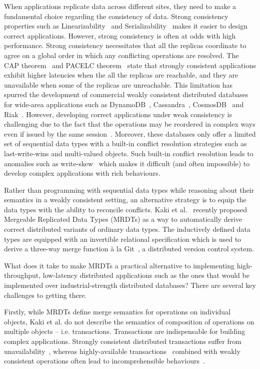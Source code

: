 When applications replicate data across different sites, they need to make a
fundamental choice regarding the consistency of data. Strong consistency properties such
as Linearizability~\cite{Herlihy90} and Serializability~\cite{Bernstein79}
makes it easier to design correct applications. However, strong consistency is often at
odds with high performance. Strong consistency necessitates that all the replicas
coordinate to agree on a global order in which any conflicting operations are
resolved. The CAP theorem~\cite{Gilbert02} and PACELC theorem~\cite{Abadi12}
state that strongly consistent applications exhibit higher latencies when the all
the replicas are reachable, and they are unavailable when some of the replicas are
unreachable. This limitation has spurred the development of commercial weakly
consistent distributed databases for wide-area applications such as
DynamoDB~\cite{DynamoDB}, Cassandra~\cite{Cassandra}, CosmosDB~\cite{CosmosDB}
and Riak~\cite{Riak}. However, developing correct applications under weak
consistency is challenging due to the fact that the operations may be reordered
in complex ways even if issued by the same session~\cite{Burckhardt14}.
Moreover, these databases only offer a limited set of sequential data types
with a built-in conflict resolution strategies such as last-write-wins and
multi-valued objects. Such built-in conflict resolution leads to anomalies such
as write-skew~\cite{Berenson95} which makes it difficult (and often impossible)
to develop complex applications with rich behaviours.

Rather than programming with sequential data types while reasoning about their
semantics in a weakly consistent setting, an alternative strategy is to equip
the data types with the ability to reconcile conflicts. Kaki et
al.~\cite{Kaki19} recently proposed Mergeable Replicated Data Types (MRDTs) as
a way to automatically derive correct distributed variants of ordinary data
types. The inductively defined data types are equipped with an invertible
relational specification which is used to derive a three-way merge function \`a
la Git~\cite{Git}, a distributed version control system.

What does it take to make MRDTs a practical alternative to implementing
high-throughput, low-latency distributed applications such as the ones that
would be implemented over industrial-strength distributed databases? There are
several key challenges to getting there.

Firstly, while MRDTs define merge semantics for
operations on individual objects, Kaki et al. do not describe the semantics of
composition of operations on multiple objects -- i.e. transactions. Transactions
are indispensable for building complex applications. Strongly consistent
distributed transactions suffer from unavailability~\cite{Abadi12}, whereas
highly-available transactions~\cite{Bailis13} combined with weakly consistent
operations often lead to incomprehensible behaviours~\cite{Viotti16}.

